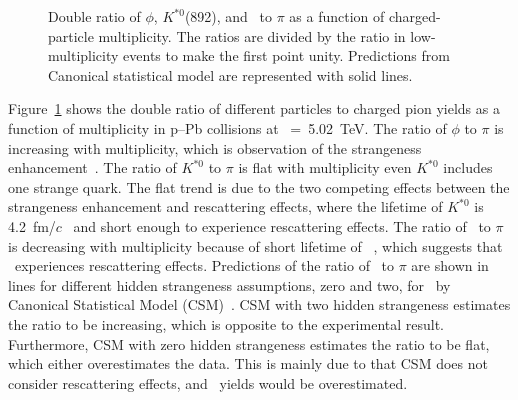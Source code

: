\begin{figure}[!hbt]
	\centering
	\caption{ Double ratio of $\phi$, $K^{*0}$(892), and \fzero~to $\pi$ as a function of charged-particle multiplicity. The ratios are divided by the ratio in low-multiplicity events to make the first point unity. Predictions from Canonical statistical model are represented with solid lines. }
	\label{fig:f0piAddCSM}
\end{figure}

Figure~\ref{fig:f0piAddCSM} shows the double ratio of different particles to charged pion yields as a function of multiplicity in p--Pb collisions at \snn~=~5.02~TeV. The ratio of $\phi$ to $\pi$ is increasing with multiplicity, which is observation of the strangeness enhancement~\cite{ALICE:2016fzo}. The ratio of $K^{*0}$ to $\pi$ is flat with multiplicity even $K^{*0}$ includes one strange quark. The flat trend is due to the two competing effects between the strangeness enhancement and rescattering effects, where the lifetime of $K^{*0}$ is 4.2~fm/$c$~\cite{ParticleDataGroup:2020ssz} and short enough to experience rescattering effects. The ratio of \fzero~to $\pi$ is decreasing with multiplicity because of short lifetime of \fzero~, which suggests that \fzero~experiences rescattering effects. Predictions of the ratio of \fzero~to $\pi$ are shown in lines for different hidden strangeness assumptions, zero and two, for \fzero~by Canonical Statistical Model (CSM)~\cite{Vovchenko:2019kes}. CSM with two hidden strangeness estimates the ratio to be increasing, which is opposite to the experimental result. Furthermore, CSM with zero hidden strangeness estimates the ratio to be flat, which either overestimates the data. This is mainly due to that CSM does not consider rescattering effects, and \fzero~yields would be overestimated.  


